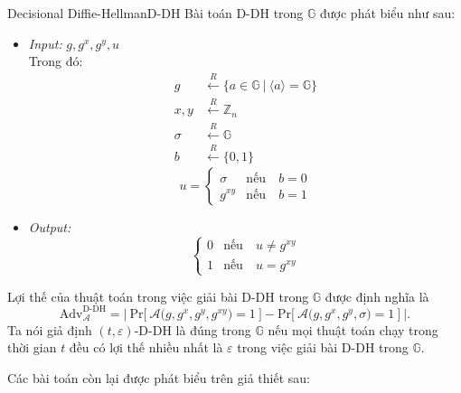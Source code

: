 \documentclass[class=report, crop=false]{standalone}
\begin{document}
		\begin{problem}{Decisional Diffie-Hellman}{D-DH}
			Bài toán D-DH trong $\mathbb{G}$ được phát biểu như sau:
			\vspace{-\baselineskip}
			\begin{itemize}[leftmargin=1.5cm, itemindent=-0.5cm]
				\item[] \textit{Input:} $g, g^x, g^y, u$ \\
				Trong đó: \vspace{-\baselineskip}
				\begin{align*}
					g 		&\xleftarrow{R} \{ a \in \mathbb{G}\ | \ \langle a \rangle = \mathbb{G} \} 	\\
					x, y 	&\xleftarrow{R} \mathbb{Z}_n 												\\
					\sigma 	&\xleftarrow{R} \mathbb{G}													\\
					b 		&\xleftarrow{R} \{ 0, 1 \}
				\end{align*}
				\[
					u = \begin{cases}
						\sigma 	&\text{nếu}\quad b = 0 \\
						g^{xy} 	&\text{nếu}\quad b = 1
					\end{cases}
				\]
				\item[] \textit{Output:}
				\[
					\begin{cases}
						0 &\text{nếu}\quad u \neq g^{xy} \\
						1 &\text{nếu}\quad u = g^{xy}
					\end{cases}
				\]
			\end{itemize}
			\vspace{-\baselineskip}\par
			Lợi thế của thuật toán \algo trong việc giải bài D-DH trong $\mathbb{G}$ được định nghĩa là
			\[
				\text{Adv}_{\mathcal{A}}^{\text{D-DH}} = \Bigg|\ \text{Pr}\bigg[ \ \mathcal{A}\Big(g, g^x, g^y, g^{xy} \Big) = 1 \ \bigg] - \text{Pr}\bigg[ \ \mathcal{A}\Big(g, g^x, g^y, \sigma \Big) = 1 \ \bigg]\ \Bigg|.
			\] \indent
			Ta nói giả định $(t, \varepsilon)$-D-DH là đúng trong $\mathbb{G}$ nếu mọi thuật toán chạy trong thời gian $t$ đều có lợi thế nhiều nhất là $\varepsilon$ trong việc giải bài D-DH trong $\mathbb{G}$.
		\end{problem}
		Các bài toán còn lại được phát biểu trên giả thiết sau:
		
\end{document}
